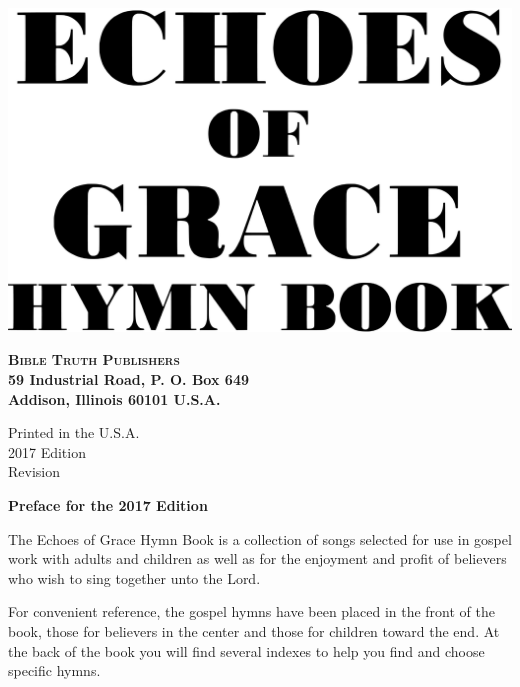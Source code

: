 \documentclass{book}
\begin{document}

\vspace*{1in}

\noindent\hfil\includegraphics[scale=0.06]{booklayout/bodoni-scan}\hfil

\vfill

\begin{center}
\textbf{
\large\textsc{Bible Truth Publishers}\\
\small{59 Industrial Road, P. O. Box 649\\
Addison, Illinois 60101 U.S.A.\\
}
}
\end{center}

\pagebreak

\vspace*{\fill}
\begin{center}
Printed in the U.S.A.\\
2017 Edition\\
Revision 
\end{center}

\pagebreak


\vspace*{1in}
\noindent\hfil{\textbf{Preface for the 2017 Edition}}\hfil

The {\textit{}Echoes of Grace Hymn Book} is a collection of songs selected for
use in gospel work with adults and children as well as for the enjoyment and
profit of believers who wish to sing together unto the Lord.

For convenient reference, the gospel hymns have been placed in the front of the
book, those for believers in the center and those for children toward the end.
At the back of the book you will find several indexes to help you find and
choose specific hymns.
\end{document}

